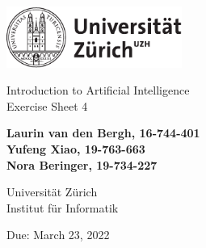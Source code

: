 \documentclass[12pt]{article}
\begin{document}
\begin{titlepage}
\includegraphics[height=20mm]{../images/uzh_logo}\\

\begin{flushleft}

\vspace{2cm}

{\Large Introduction to Artificial Intelligence\\Exercise Sheet 4}\\

\vspace{4cm}

\textbf{Laurin van den Bergh, 16-744-401\\Yufeng Xiao, 19-763-663\\Nora Beringer, 19-734-227}\\

\vspace{2cm}

Universität Zürich\\
Institut für Informatik

\vfill Due: March 23, 2022

\vspace{3cm}


\end{flushleft}
\end{titlepage}

\newpage
\end{document}
